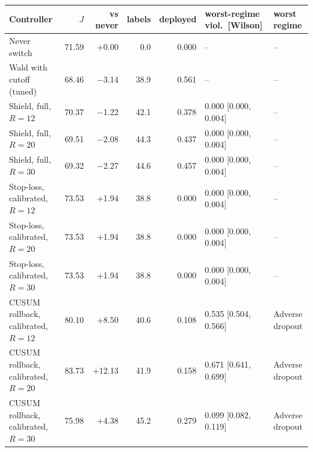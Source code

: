 \begin{tabular}{@{}l r r r r l l@{}}
\toprule
Controller & $J$ & vs never & labels & deployed & worst-regime viol.\ [Wilson] & worst regime \\
\midrule
Never switch & 71.59 & +0.00 & 0.0 & 0.000 & -- & -- \\
Wald with cutoff (tuned) & 68.46 & $-$3.14 & 38.9 & 0.561 & -- & -- \\
Shield, full, $R=12$ & 70.37 & $-$1.22 & 42.1 & 0.378 & 0.000 [0.000, 0.004] & -- \\
Shield, full, $R=20$ & 69.51 & $-$2.08 & 44.3 & 0.437 & 0.000 [0.000, 0.004] & -- \\
Shield, full, $R=30$ & 69.32 & $-$2.27 & 44.6 & 0.457 & 0.000 [0.000, 0.004] & -- \\
Stop-loss, calibrated, $R=12$ & 73.53 & +1.94 & 38.8 & 0.000 & 0.000 [0.000, 0.004] & -- \\
Stop-loss, calibrated, $R=20$ & 73.53 & +1.94 & 38.8 & 0.000 & 0.000 [0.000, 0.004] & -- \\
Stop-loss, calibrated, $R=30$ & 73.53 & +1.94 & 38.8 & 0.000 & 0.000 [0.000, 0.004] & -- \\
CUSUM rollback, calibrated, $R=12$ & 80.10 & +8.50 & 40.6 & 0.108 & 0.535 [0.504, 0.566] & Adverse dropout \\
CUSUM rollback, calibrated, $R=20$ & 83.73 & +12.13 & 41.9 & 0.158 & 0.671 [0.641, 0.699] & Adverse dropout \\
CUSUM rollback, calibrated, $R=30$ & 75.98 & +4.38 & 45.2 & 0.279 & 0.099 [0.082, 0.119] & Adverse dropout \\
\bottomrule
\end{tabular}
